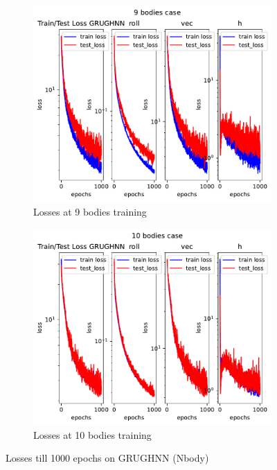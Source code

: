 \begin{figure}[H]
	\centering
	\begin{subfigure}[b]{0.4\textwidth}
		\centering
		\includegraphics[width=\textwidth]{chapters/chapter5/loss_9.pdf}
		\caption{Losses at 9 bodies training}
	\end{subfigure}
	\hfill
	\begin{subfigure}[b]{0.4\textwidth}
		\centering
		\includegraphics[width=\textwidth]{chapters/chapter5/loss_10.pdf}
		\caption{Losses at 10 bodies training}
	\end{subfigure}
	
	
	\caption{Losses till 1000 epochs on GRUGHNN (Nbody)}
	\label{fig_traj}
\end{figure}


